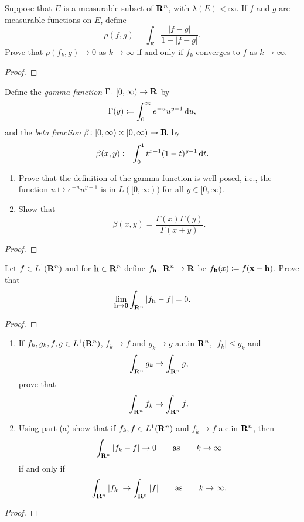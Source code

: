\begin{problem}
Suppose that $E$ is a measurable subset of $\mathbf{R}^n$, with
$\lambda(E)<\infty$. If $f$ and $g$ are measurable functions on $E$, define
\[
\rho(f,g)=\int_E\frac{|f-g|}{1+|f-g|}.
\]
Prove that $\rho(f_k,g)\to 0$ as $k\to\infty$ if and only if $f_k$
converges to $f$ as $k\to\infty$.
\end{problem}
\begin{proof}
\end{proof}

\begin{problem}
Define the \emph{gamma function} $\Gamma\colon[0,\infty)\to\mathbf{R}$ by
\[
\Gamma(y)\coloneqq\int_0^\infty e^{-u}u^{y-1}\mathop{}\!\mathrm{d} u,
\]
and the \emph{beta function} $\beta\colon[0,\infty)\times[0,\infty)\to\mathbf{R}$
by
\[
\beta(x,y)\coloneqq\int_0^1 t^{x-1}(1-t)^{y-1}\mathop{}\!\mathrm{d} t.
\]
\begin{enumerate}[label=(\alph*)]
\item Prove that the definition of the gamma function is well-posed, i.e.,
  the function $u\mapsto e^{-u}u^{y-1}$ is in $L([0,\infty))$ for all
  $y\in[0,\infty)$.
\item Show that
\[
\beta(x,y)=\frac{\Gamma(x)\Gamma(y)}{\Gamma(x+y)}.
\]
\end{enumerate}
\end{problem}
\begin{proof}
\end{proof}

\begin{problem}
Let $f\in L^1(\mathbf{R}^n)$ and for $\mathbf{h}\in\mathbf{R}^n$ define
$f_{\mathbf{h}}\colon\mathbf{R}^n\to\mathbf{R}$ be $f_{\mathbf{h}}(x)\coloneqq
f(\mathbf{x}-\mathbf{h})$. Prove that
\[
\lim_{\mathbf{h}\to\mathbf{0}}\int_{\mathbf{R}^n}\left|f_{\mathbf{h}}-f\right|=0.
\]
\end{problem}
\begin{proof}
\end{proof}

\begin{problem}
\begin{enumerate}[label=(\alph*)]
\item If $f_k,g_k,f,g\in L^1(\mathbf{R}^n)$, $f_k\to f$ and $g_k\to g$ a.e.\@ in
  $\mathbf{R}^n$, $|f_k|\leq g_k$ and
\[
\int_{\mathbf{R}^n}g_k\to\int_{\mathbf{R}^n}g,
\]
prove that
\[
\int_{\mathbf{R}^n} f_k\to\int_{\mathbf{R}^n}f.
\]
\item Using part (a) show that if $f_k,f\in L^1(\mathbf{R}^n)$ and $f_k\to f$
  a.e.\@ in $\mathbf{R}^n$, then
\[
\int_{\mathbf{R}^n}|f_k-f|\to 0\qquad\text{as}\qquad k\to\infty
\]
if and only if
\[
\int_{\mathbf{R}^n}|f_k|\to\int_{\mathbf{R}^n}|f|\qquad\text{as}\qquad k\to\infty.
\]
\end{enumerate}
\end{problem}
\begin{proof}
\end{proof}

